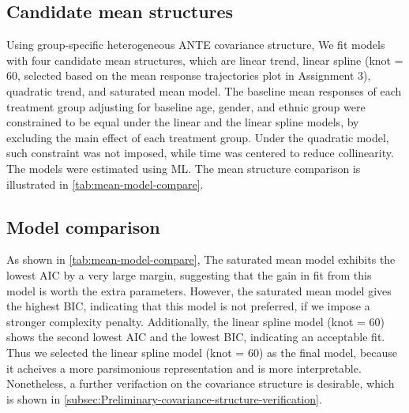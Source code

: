 \documentclass[12pt]{article}
\begin{document}
\subsection{Candidate mean structures}

\begin{table}[htbp]
\caption{Model comparison for candidate mean structures}
\label{tab:mean-model-compare}
\centering
{}
\end{table}

Using group-specific heterogeneous ANTE covariance structure, 
We fit models with four candidate mean structures,
which are linear trend, linear spline (knot = 60, selected
based on the mean response trajectories plot in Assignment 3),
quadratic trend, and saturated mean model. 
The baseline mean responses of each treatment group
adjusting for baseline age, gender, and ethnic group
were constrained to be equal under
the linear and the linear spline models,
by excluding the main effect
of each treatment group.
Under the quadratic model, such constraint was not
imposed, while time was centered to reduce collinearity.
The models were
estimated using ML. The mean structure comparison
is illustrated in \cref{tab:mean-model-compare}.

\subsection{Model comparison}

As shown in \cref{tab:mean-model-compare},
The saturated mean model exhibits the lowest AIC by a very
large margin,
suggesting that the gain in fit from this model
is worth the extra parameters.
However, the saturated mean model gives the highest BIC,
indicating that this model is not preferred,
if we impose a stronger complexity penalty.
Additionally, the linear spline model (knot = 60)
shows the second lowest AIC and the lowest BIC,
indicating an acceptable fit.
Thus we selected the linear spline model (knot = 60)
as the final model, because it acheives a more
parsimonious representation and is more interpretable.
Nonetheless, a further verifaction on the covariance structure
is desirable, which is shown in \cref{subsec:Preliminary-covariance-structure-verification}.
\end{document}
